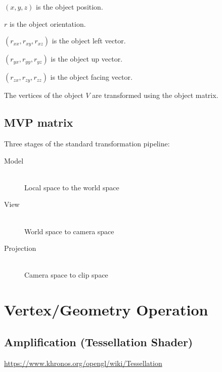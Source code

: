 \documentclass[a4paper]{article}
\begin{document}
$(x, y, z)$ is the object position.

$r$ is the object orientation.

$(r_{xx}, r_{xy}, r_{xz})$ is the object left vector.

$(r_{yx}, r_{yy}, r_{yz})$ is the object up vector.

$(r_{zx}, r_{zy}, r_{zz})$ is the object facing vector.

The vertices of the object $V$ are transformed using the object matrix.

\subsection{MVP matrix}

Three stages of the standard transformation pipeline:

\begin{description}
  \item[Model] \hfill \\
    Local space to the world space

  \item[View] \hfill \\
    World space to camera space

  \item[Projection] \hfill \\
    Camera space to clip space

\end{description}

\section{Vertex/Geometry Operation}

\subsection{Amplification (Tessellation Shader)}

\url{https://www.khronos.org/opengl/wiki/Tessellation}
\end{document}
